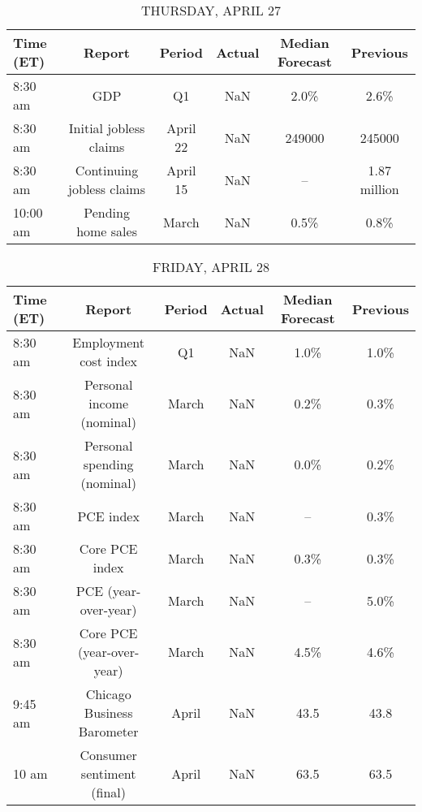 \documentclass{article}%
\begin{document}
%


\begin{table}[htbp]%
\caption{THURSDAY, APRIL 27}%
\centering%
\begin{adjustbox}{width=1\textwidth}%
\begin{tabular}{lccccc}
\toprule
Time (ET) &                    Report &   Period & Actual & Median Forecast &     Previous \\
\midrule
  8:30 am &                       GDP &       Q1 &    NaN &            2.0\% &         2.6\% \\
  8:30 am &    Initial jobless claims & April 22 &    NaN &          249000 &       245000 \\
  8:30 am & Continuing jobless claims & April 15 &    NaN &              -- & 1.87 million \\
 10:00 am &        Pending home sales &    March &    NaN &            0.5\% &         0.8\% \\
\bottomrule
\end{tabular}
%
\end{adjustbox}%
\end{table}

%


\begin{table}[htbp]%
\caption{FRIDAY, APRIL 28}%
\centering%
\begin{adjustbox}{width=1\textwidth}%
\begin{tabular}{lccccc}
\toprule
Time (ET) &                      Report & Period & Actual & Median Forecast & Previous \\
\midrule
  8:30 am &       Employment cost index &     Q1 &    NaN &            1.0\% &     1.0\% \\
  8:30 am &   Personal income (nominal) &  March &    NaN &            0.2\% &     0.3\% \\
  8:30 am & Personal spending (nominal) &  March &    NaN &            0.0\% &     0.2\% \\
  8:30 am &                   PCE index &  March &    NaN &              -- &     0.3\% \\
  8:30 am &              Core PCE index &  March &    NaN &            0.3\% &     0.3\% \\
  8:30 am &        PCE (year-over-year) &  March &    NaN &              -- &     5.0\% \\
  8:30 am &   Core PCE (year-over-year) &  March &    NaN &            4.5\% &     4.6\% \\
  9:45 am &  Chicago Business Barometer &  April &    NaN &            43.5 &     43.8 \\
    10 am &  Consumer sentiment (final) &  April &    NaN &            63.5 &     63.5 \\
\bottomrule
\end{tabular}
%
\end{adjustbox}%
\end{table}
\end{document}
